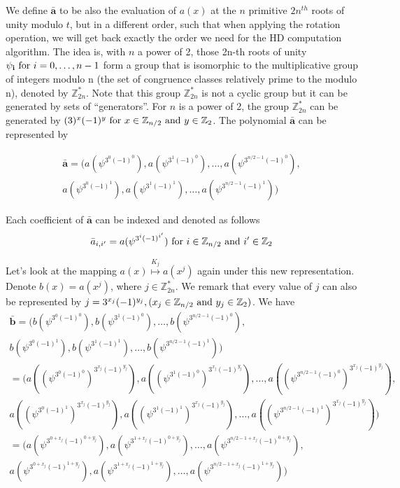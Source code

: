 \begin{description}
  We define \(\mathbf{\bar{a}}\) to be also the evaluation of \(a(x)\) at the
  \(n\) primitive \(2n^{th}\) roots of unity modulo \(t\), but in a different
  order, such that when applying the rotation operation, we will get back
  exactly the order we need for the HD computation algorithm. The idea is, with
  \(n\) a power of 2, those 2n-th roots of unity
  \(\mathbf{\psi_{i}} \textnormal{ for } i = 0, \dots, n-1\) form a group that
  is isomorphic to the multiplicative group of integers modulo n (the set of
  congruence classes relatively prime to the modulo n), denoted by
  \(\mathbb{Z}_{2n}^{*}\). Note that this group \(\mathbb{Z}_{2n}^{*}\) is not a cyclic group but it can
  be generated by sets of ``generators''. For \(n\) is a power of 2, the group
  \(\mathbb{Z}_{2n}^{*}\) can be generated by
  \((3)^{x}(-1)^{y} \textnormal{ for } x \in \mathbb{Z}_{n/2} \textnormal{ and } y
  \in \mathbb{Z}_{2}\). The polynomial \(\mathbf{\bar{a}}\) can be represented by

  \begin{align*}
       \mathbf{\bar{a}} = (a(\psi^{3^{0}(-1)^{0}}),a(\psi^{3^{1}(-1)^{0}}), \dots,
    a(\psi^{3^{n/2 -1}(-1)^{0}}), \\ a(\psi^{3^{0}(-1)^{1}}),
    a(\psi^{3^{1}(-1)^{1}}), \dots,a(\psi^{3^{n/2 -1}(-1)^{1}}))
  \end{align*}

  Each coefficient of \(\mathbf{\bar{a}}\) can be indexed and denoted as follows
  \[
    \bar{a}_{i,i'} = a(\psi^{3^{i}(-1)^{i'}}) \textnormal{ for } i \in
    \mathbb{Z}_{n/2} \textnormal{ and } i' \in \mathbb{Z}_{2}
  \]

  Let's look at the mapping \(a(x) \stackrel{K_{j}}{\mapsto} a(x^{j})\) again under this new
  representation. Denote \(b(x) = a(x^{j})\), where
  \(j \in \mathbb{Z}_{2n}^{*}\). We remark that every value of \(j\) can also be
  represented by
  \(j = 3^{x_{j}}(-1)^{y_{j}}, (x_{j} \in \mathbb{Z}_{n/2} \textnormal{ and }
  y_{j} \in \mathbb{Z}_{2})\). We have
  \begin{align*}
    \mathbf{\bar{b}} = (b(\psi^{3^{0}(-1)^{0}}),b(\psi^{3^{1}(-1)^{0}}), \dots,
    b(\psi^{3^{n/2 -1}(-1)^{0}}), \\ b(\psi^{3^{0}(-1)^{1}}),
    b(\psi^{3^{1}(-1)^{1}}), \dots,b(\psi^{3^{n/2 -1}(-1)^{1}}))\\
    = (a((\psi^{3^{0}(-1)^{0}})^{3^{x_{j}}(-1)^{y_{j}}}),a((\psi^{3^{1}(-1)^{0}})^{3^{x_{j}}(-1)^{y_{j}}}), \dots,
    a((\psi^{3^{n/2 -1}(-1)^{0}})^{3^{x_{j}}(-1)^{y_{j}}}), \\ a((\psi^{3^{0}(-1)^{1}})^{3^{x_{j}}(-1)^{y_{j}}}),
    a((\psi^{3^{1}(-1)^{1}})^{3^{x_{j}}(-1)^{y_{j}}}), \dots,a((\psi^{3^{n/2 -1}(-1)^{1}})^{3^{x_{j}}(-1)^{y_{j}}}))\\
    = (a(\psi^{3^{0 + x_{j}}(-1)^{0 + y_{j}}}), a(\psi^{3^{1 + x_{j}}(-1)^{0 + y_{j}}}), \dots,a(\psi^{3^{n/2 - 1 + x_{j}}(-1)^{0 + y_{j}}}),\\
    a(\psi^{3^{0 + x_{j}}(-1)^{1 + y_{j}}}), a(\psi^{3^{1 + x_{j}}(-1)^{1 + y_{j}}}), \dots, a(\psi^{3^{n/2 - 1 + x_{j}}(-1)^{1 + y_{j}}}))
  \end{align*}


\end{description}

